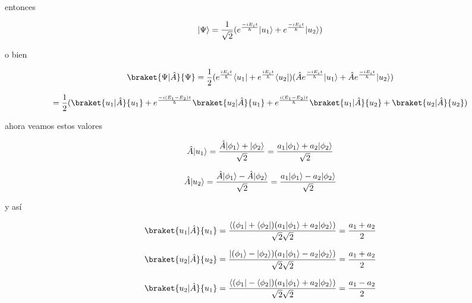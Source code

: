 \documentclass[12pt,a4paper]{article}
\DeclarePairedDelimiter\bra{\langle}{\rvert}
\DeclarePairedDelimiter\ket{\lvert}{\rangle}
\begin{document}
\begin{enumerate}
\begin{enumerate}
    entonces
    
    \begin{equation*}
        \ket{\Psi} = \frac{1}{\sqrt{2}} (e^{\frac{-iE_i t}{\hbar}} \ket{u_1} + e^{\frac{-iE_i t}{\hbar}} \ket{u_2})
    \end{equation*}
    
    o bien
    
    \begin{equation*}
        \braket{\Psi|\hat{A}}{\Psi} = \frac{1}{2} (e^{\frac{iE_i t}{\hbar}} \bra{u_1} + e^{\frac{iE_i t}{\hbar}} \bra{u_2})(\hat{A}e^{\frac{-iE_i t}{\hbar}} \ket{u_1} +\hat{A} e^{\frac{-iE_i t}{\hbar}} \ket{u_2})
    \end{equation*}
    
    \begin{equation*}
        = \frac{1}{2} (\braket{u_1|\hat{A}}{u_1} + e^{\frac{-i(E_1 - E_2)t}{\hbar}}\braket{u_2|\hat{A}}{u_1} + e^{\frac{i (E_1 -E_2)t}{\hbar}} \braket{u_1 |\hat{A}}{u_2} + \braket{u_2|\hat{A}}{u_2})
    \end{equation*}
    
    ahora veamos estos valores
    
    \begin{equation*}
        \hat{A} \ket{u_1} = \frac{\hat{A}\ket{\phi_1} + \ket{\phi_2}}{\sqrt{2}} = \frac{a_1 \ket{\phi_1} + a_2 \ket{\phi_2}}{\sqrt{2}}
    \end{equation*}
    
    \begin{equation*}
        \hat{A} \ket{u_2} = \frac{\hat{A} \ket{\phi_1} - \hat{A} \ket{\phi_2}}{\sqrt{2}} = \frac{a_1 \ket{\phi_1} - a_2 \ket{\phi_2}}{\sqrt{2}}
    \end{equation*}
    
    y así
    
    \begin{equation*}
        \braket{u_1| \hat{A}}{u_1} = \frac{\bra{(\phi_1} + \bra{\phi_2})(a_1 \ket{\phi_1} + a_2 \ket{\phi_2})}{\sqrt{2}\sqrt{2}} = \frac{a_1 + a_2}{2}
    \end{equation*}
    
    \begin{equation*}
        \braket{u_2|\hat{A}}{u_2} = \frac{\ket{(\phi_1} - \ket{\phi_2})(a_1\ket{\phi_1}- a_2 \ket{\phi_2})}{\sqrt{2}\sqrt{2}} = \frac{a_1 + a_2}{2}
    \end{equation*}
    
    
    \begin{equation*}
        \braket{u_2|\hat{A}}{u_1} = \frac{\bra{(\phi_1} - \bra{\phi_2})(a_1 \ket{\phi_1} + a_2 \ket{\phi_2})}{\sqrt{2}\sqrt{2}} = \frac{a_1 - a_2}{2}
    \end{equation*}
    

\end{enumerate}
\end{enumerate}
\end{document}
